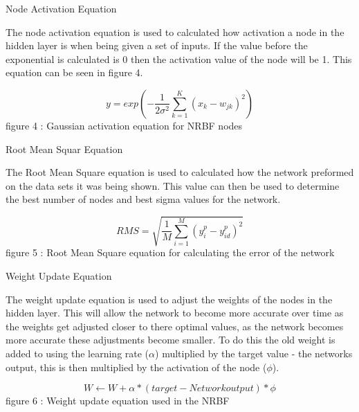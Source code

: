 \documentclass{IEEEtran}[11pt]
\begin{document}
\begin{center}
  Node Activation Equation
\end{center}
\begin{flushleft}
  The node activation equation is used to calculated how activation a node in
  the hidden layer is when being given a set of inputs. If the value before
  the exponential is calculated is 0 then the activation value of the node
  will be 1. This equation can be seen in figure 4.
\end{flushleft}
$$y=exp(-\frac{1}{2\sigma^2} \sum_{k=1}^{K}(x_{k} - w_{jk})^2) $$
{\footnotesize figure 4 : Gaussian activation equation for NRBF nodes}
\begin{center}
  Root Mean Squar Equation
\end{center}
\begin{flushleft}
  The Root Mean Square equation is used to calculated how the network preformed
  on the data sets it was being shown. This value can then be used to determine
  the best number of nodes and best sigma values for the network.
\end{flushleft}
$$RMS =\sqrt{\frac{1}{M}\sum_{i=1}^{M}(y^{p}_{i} - y^{p}_{id})^2} $$
{\footnotesize figure 5 : Root Mean Square equation for calculating the error of the network}
\begin{center}
  Weight Update Equation
\end{center}
\begin{flushleft}
  The weight update equation is used to adjust the weights of the nodes in the
  hidden layer.
  This will allow the network to become more accurate over time as the weights
  get adjusted closer to there optimal values, as the network becomes more
  accurate these adjustments become smaller. To do this the old weight is
  added to using the learning rate ($\alpha$) multiplied by the target value
  - the networks output, this is then multiplied by the activation of the node
  ($\phi$).
\end{flushleft}
$$ W  \leftarrow W + \alpha *(target - Network output)*\phi$$
{\footnotesize figure 6 : Weight update equation used in the NRBF}
\end{document}
